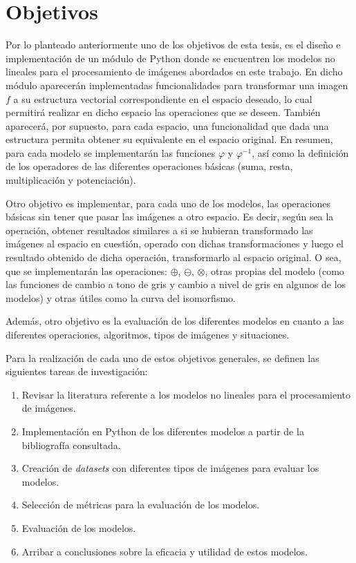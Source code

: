 \section*{Objetivos}

Por lo planteado anteriormente uno de los objetivos de esta tesis, es el dise\~no e implementaci\'on de un m\'odulo de Python donde se encuentren los modelos no lineales para el procesamiento de im\'agenes abordados en este trabajo. En dicho m\'odulo aparecer\'an implementadas funcionalidades para transformar una imagen $f$ a su estructura vectorial correspondiente en el espacio deseado, lo cual permitir\'a realizar en dicho espacio las operaciones que se deseen. Tambi\'en aparecer\'a, por supuesto, para cada espacio, una funcionalidad que dada una estructura permita obtener su equivalente en el espacio original. En resumen, para cada modelo se implementar\'an las funciones $\varphi$ y $\varphi^{-1}$, as\'i como la definici\'on de los operadores de las diferentes operaciones b\'asicas (suma, resta, multiplicaci\'on y potenciaci\'on).

Otro objetivo es implementar, para cada uno de los modelos, las operaciones b\'asicas sin tener que pasar las im\'agenes a otro espacio. Es decir, seg\'un sea la operaci\'on, obtener resultados similares a si se hubieran transformado las im\'agenes al espacio en cuesti\'on, operado con dichas transformaciones y luego el resultado obtenido de dicha operaci\'on, transformarlo al espacio original. O sea, que se implementar\'an las operaciones: $\oplus$, $\ominus$, $\otimes$, otras propias del modelo (como las funciones de cambio a tono de gris y cambio a nivel de gris en algunos de los modelos) y otras \'utiles como la curva del isomorfismo.

Adem\'as, otro objetivo es la evaluaci\'on de los diferentes modelos en cuanto a las diferentes operaciones, algoritmos, tipos de im\'agenes y situaciones.

Para la realizaci\'on de cada uno de estos objetivos generales, se definen las siguientes tareas de investigaci\'on:

\begin{enumerate}
	\item Revisar la literatura referente a los modelos no lineales para el procesamiento de im\'agenes.
	\item Implementaci\'on en Python de los diferentes modelos a partir de la bibliograf\'ia consultada.
	\item Creaci\'on de \textit{datasets} con diferentes tipos de im\'agenes para evaluar los modelos.
	\item Selecci\'on de m\'etricas para la evaluaci\'on de los modelos.
	\item Evaluaci\'on de los modelos.
	\item Arribar a conclusiones sobre la eficacia y utilidad de estos modelos. 
\end{enumerate}


